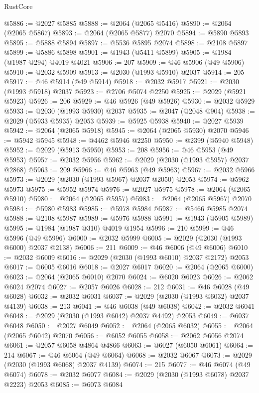 \begin{lexlean}{RustCore}
\begin{coremodule}
@5886 := @2027 @5885
@5888 := @2064 (@2065 @5416)
@5890 := @2064 (@2065 @5867)
@5893 := @2064 (@2065 @5877) @2070
@5894 := @5890 @5893
@5895 := @5888 @5894
@5897 := @5536 @5895 @2074
@5898 := @2108 @5897
@5899 := @5886 @5898
@5901 := @1943 (@5411 @5899)
@5905 := @1984 (@1987 @294) @4019 @4021
@5906 := 207
@5909 := @46 @5906 (@49 @5906)
@5910 := @2032 @5909
@5913 := @2030 (@1993 @5910) @2037
@5914 := 205
@5917 := @46 @5914 (@49 @5914)
@5918 := @2032 @5917
@5921 := @2030 (@1993 @5918) @2037
@5923 := @2706 @5074 @2250
@5925 := @2029 (@5921 @5923)
@5926 := 206
@5929 := @46 @5926 (@49 @5926)
@5930 := @2032 @5929
@5933 := @2030 (@1993 @5930) @2037
@5935 := @2047 (@2048 @904)
@5938 := @2029 (@5933 @5935) @2053
@5939 := @5925 @5938
@5940 := @2027 @5939
@5942 := @2064 (@2065 @5918)
@5945 := @2064 (@2065 @5930) @2070
@5946 := @5942 @5945
@5948 := @4462 @5946 @2250
@5950 := @2399 (@5940 @5948)
@5952 := @2029 (@5913 @5950)
@5953 := 208
@5956 := @46 @5953 (@49 @5953)
@5957 := @2032 @5956
@5962 := @2029 (@2030 (@1993 @5957) @2037 @2868)
@5963 := 209
@5966 := @46 @5963 (@49 @5963)
@5967 := @2032 @5966
@5973 := @2029 (@2030 (@1993 @5967) @2037 @2050) @2053
@5974 := @5962 @5973
@5975 := @5952 @5974
@5976 := @2027 @5975
@5978 := @2064 (@2065 @5910)
@5980 := @2064 (@2065 @5957)
@5983 := @2064 (@2065 @5967) @2070
@5984 := @5980 @5983
@5985 := @5978 @5984
@5987 := @5466 @5985 @2074
@5988 := @2108 @5987
@5989 := @5976 @5988
@5991 := @1943 (@5905 @5989)
@5995 := @1984 (@1987 @310) @4019 @1954
@5996 := 210
@5999 := @46 @5996 (@49 @5996)
@6000 := @2032 @5999
@6005 := @2029 (@2030 (@1993 @6000) @2037 @2138)
@6006 := 211
@6009 := @46 @6006 (@49 @6006)
@6010 := @2032 @6009
@6016 := @2029 (@2030 (@1993 @6010) @2037 @2172) @2053
@6017 := @6005 @6016
@6018 := @2027 @6017
@6020 := @2064 (@2065 @6000)
@6023 := @2064 (@2065 @6010) @2070
@6024 := @6020 @6023
@6026 := @2062 @6024 @2074
@6027 := @2057 @6026
@6028 := 212
@6031 := @46 @6028 (@49 @6028)
@6032 := @2032 @6031
@6037 := @2029 (@2030 (@1993 @6032) @2037 @4139)
@6038 := 213
@6041 := @46 @6038 (@49 @6038)
@6042 := @2032 @6041
@6048 := @2029 (@2030 (@1993 @6042) @2037 @4492) @2053
@6049 := @6037 @6048
@6050 := @2027 @6049
@6052 := @2064 (@2065 @6032)
@6055 := @2064 (@2065 @6042) @2070
@6056 := @6052 @6055
@6058 := @2062 @6056 @2074
@6061 := @2057 @6058 @4864 @4866
@6063 := @6027 (@6050 @6061)
@6064 := 214
@6067 := @46 @6064 (@49 @6064)
@6068 := @2032 @6067
@6073 := @2029 (@2030 (@1993 @6068) @2037 @4139)
@6074 := 215
@6077 := @46 @6074 (@49 @6074)
@6078 := @2032 @6077
@6084 := @2029 (@2030 (@1993 @6078) @2037 @2223) @2053
@6085 := @6073 @6084

\end{coremodule}
\end{lexlean}
